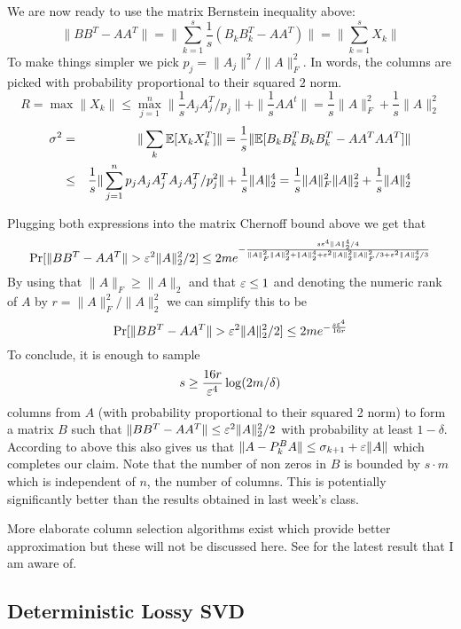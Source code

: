 \documentclass{article}
\begin{document}
We are now ready to use the matrix Bernstein inequality above: 
\[
\|BB^T - AA^T\| = \|\sum_{k=1}^{s}  \frac{1}{s}(B_kB_k^T - AA^T)\| = \|\sum_{k=1}^{s}  X_k\|
\]
To make things simpler we pick $p_j = \|A_j\|^2/\|A\|_F^2$. In words, the columns are picked with probability proportional to their squared $2$ norm.
\[
R = \max \|X_k\| \le \max_{j=1}^{n} \|  \frac{1}{s}A_jA_j^T/p_j\| +  \|\frac{1}{s}AA^t\| = \frac{1}{s}\|A\|_F^2 + \frac{1}{s}\|A\|_2^2
\]
\begin{eqnarray}
\sigma^2 &=& \|\sum_k {\mathbb E}[X_k X_k^T]\| = \frac{1}{s}\|{\mathbb E}[B_k B_k^TB_k B_k^T - AA^TAA^T]\| \\
&\le& \frac{1}{s}\|\sum_{j=1}^{n}p_jA_j A_j^TA_j A_j^T/p_j^2\|+ \frac{1}{s}\|A\|_2^4 = \frac{1}{s} \|A\|_F^2\|A\|_2^2 + \frac{1}{s} \|A\|_2^4
\end{eqnarray}

Plugging both expressions into the matrix Chernoff bound above we get that
\[
\Pr[\|BB^T - AA^T\| > \varepsilon^2\|A\|_2^2/2] \le 2me^{-\frac{s\varepsilon^4\|A\|_{2}^{4}/4}{\|A\|_F^2\|A\|_2^2 + \|A\|_2^4 + \varepsilon^2\|A\|_2^2\|A\|_F^2/3 + \varepsilon^2\|A\|_2^4/3}}
\]
By using that $\|A\|_F \ge \|A\|_2$ and that $\varepsilon \le 1$ and denoting the numeric rank of $A$ by $r = \|A\|_F^2/\|A\|_2^2$ we can simplify this to be
\[
\Pr[\|BB^T - AA^T\| > \varepsilon^2\|A\|_2^2/2] \le 2me^{-\frac{s\varepsilon^4}{16r}}
\]
To conclude, it is enough to sample 
\[
s \ge \frac{16r}{\varepsilon^4}\log(2m/\delta)
\] 
columns from $A$ (with probability proportional to their squared 2 norm) to form a matrix $B$ such that $\|BB^T - AA^T\| \le \varepsilon^2\|A\|_2^2/2$ with probability at least $1-\delta$. According to above this also gives us that $\|A - P_k^BA\| \le \sigma_{k+1} + \varepsilon\|A\|$ which completes our claim.
Note that the number of non zeros in $B$ is bounded by $s\cdot m$ which is independent of $n$, the number of columns.
This is potentially significantly better than the results obtained in last week's class.
 
 
\begin{remark}
More elaborate column selection algorithms exist which provide better approximation but these will not be discussed here.
See \cite{Boutsidis2011} for the latest result that I am aware of.
\end{remark}

\subsection*{Deterministic Lossy SVD}

\newcommand{\diag}{\operatorname{diag}}
\newcommand{\tr}{\operatorname{tr}}
\end{document}
